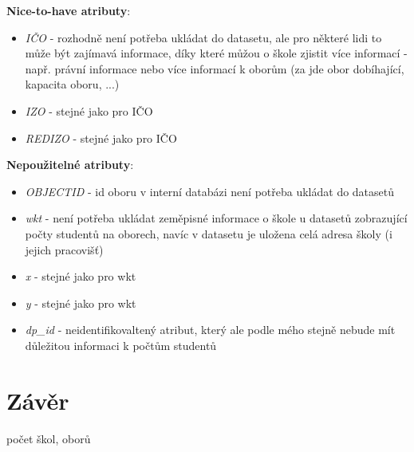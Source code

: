 \documentclass[12pt, a4paper]{article}
\begin{document}
\noindent \textbf{Nice-to-have atributy}:
\begin{itemize}
\item \textit{IČO} - rozhodně není potřeba ukládat do datasetu, ale pro některé lidi to může být zajímavá informace, díky které můžou o škole zjistit více informací - např. právní informace nebo více informací k oborům (za jde obor dobíhající, kapacita oboru, ...)
\item \textit{IZO} - stejné jako pro IČO
\item \textit{REDIZO} - stejné jako pro IČO \\
\end{itemize}

\noindent \textbf{Nepoužitelné atributy}:
\begin{itemize}
\item \textit{OBJECTID} - id oboru v interní databázi není potřeba ukládat do datasetů
\item \textit{wkt} - není potřeba ukládat zeměpisné informace o škole u datasetů zobrazující počty studentů na oborech, navíc v datasetu je uložena celá adresa školy (i jejich pracovišť)
\item \textit{x} - stejné jako pro wkt
\item \textit{y} - stejné jako pro wkt
\item \textit{dp\_id} - neidentifikovaltený atribut, který ale podle mého stejně nebude mít důležitou informaci k počtům studentů
\end{itemize}

\newpage

\section{Závěr}
počet škol, oborů
	
\end{document}
